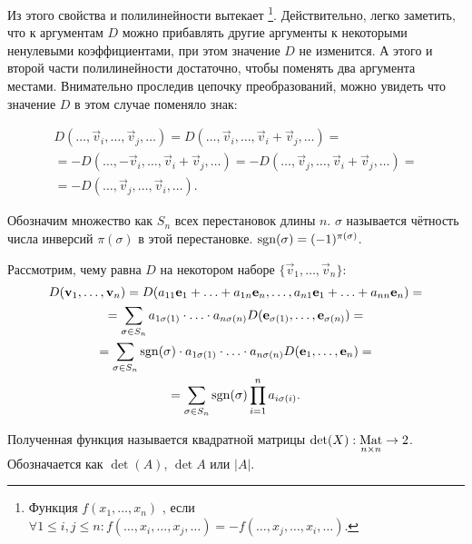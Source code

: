     Из этого свойства и полилинейности вытекает \footnote{
        Функция $f(x_1,\ldots, x_n)$ , если $\forall 1 \leqslant i,j \leqslant n: f(\ldots, x_i, \ldots, x_j, \ldots) = -f(\ldots, x_j, \ldots, x_i, \ldots)$.
    }. Действительно, легко заметить, что к аргументам $D$ можно прибавлять другие аргументы к некоторыми ненулевыми коэффициентами, при этом значение $D$ не изменится. А этого и второй части полилинейности достаточно, чтобы поменять два аргумента местами. Внимательно проследив цепочку преобразований, можно увидеть что значение $D$ в этом случае поменяло знак:
    
    \begin{multline*}
        D(\ldots, \vec{v}_i, \ldots, \vec{v}_j, \ldots) 
            = D( \ldots, \vec{v}_i, \ldots, \vec{v}_i + \vec{v}_j, \ldots) = \\
            = - D( \ldots, -\vec{v}_i, \ldots, \vec{v}_i + \vec{v}_j, \ldots)
            = -D(\ldots, \vec{v}_j, \ldots, \vec{v}_i + \vec{v}_j, \ldots) = \\
            = -D( \ldots, \vec{v}_j, \ldots, \vec{v}_i, \ldots).
    \end{multline*}
    
    Обозначим множество как $S_n$ всех перестановок длины $n$.  $\sigma$ называется чётность числа инверсий $\pi(\sigma)$ в этой перестановке.  $\operatorname{sgn}(\sigma) = (-1)^{\pi(\sigma)}$. 
    
    Рассмотрим, чему равна $D$ на некотором наборе $\{ \vec{v}_1, \ldots, \vec{v}_n \}$:
    \begin{multline}
        D(\mathbf{v}_1, \ldots, \mathbf{v}_n) 
            = D(a_{11} \mathbf{e}_1 + \ldots + a_{1n} \mathbf{e}_n, \ldots, a_{n1} \mathbf{e}_1 + \ldots + a_{nn} \mathbf{e}_n) = \\
            = \sum\limits_{\sigma \in S_n} a_{1\sigma(1)} \cdot \ldots \cdot a_{n\sigma(n)} D(\mathbf{e}_{\sigma(1)}, \ldots, \mathbf{e}_{\sigma(n)}) = \\
            = \sum\limits_{\sigma \in S_n} \operatorname{sgn}(\sigma) \cdot a_{1\sigma(1)} \cdot \ldots \cdot a_{n\sigma(n)} D (\mathbf{e}_1, \ldots, \mathbf{e}_n) = \\
            = \sum\limits_{\sigma \in S_n} \operatorname{sgn}(\sigma) \prod\limits_{i = 1}^n a_{i\sigma(i)}.
            \label{eq:det-Leibniz}
    \end{multline}
    
    Полученная функция называется  квадратной матрицы $\det(X):\underset{n \times n}{\text{Mat}} \rightarrow 2$. Обозначается как $\det(A)$, $\det A$ или $|A|$. 
    
